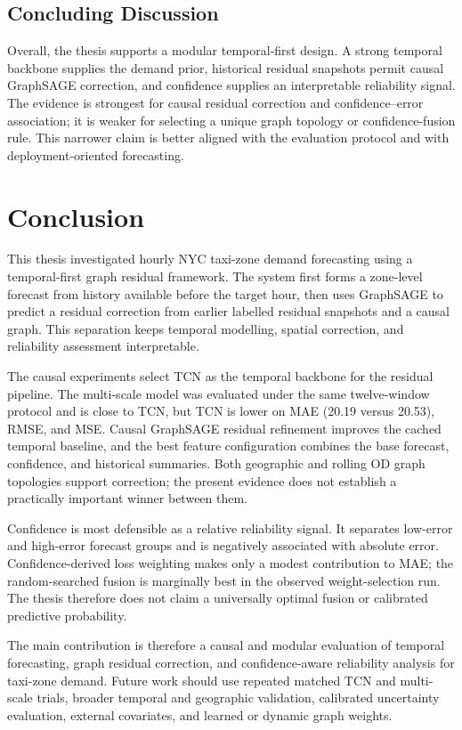\documentclass[12pt,a4paper]{report}
\begin{document}
	\section{Concluding Discussion}
	
Overall, the thesis supports a modular temporal-first design. A strong temporal backbone supplies the demand prior, historical residual snapshots permit causal GraphSAGE correction, and confidence supplies an interpretable reliability signal. The evidence is strongest for causal residual correction and confidence--error association; it is weaker for selecting a unique graph topology or confidence-fusion rule. This narrower claim is better aligned with the evaluation protocol and with deployment-oriented forecasting.
	
	\chapter{Conclusion}
	\label{sec:conclusion}
	
This thesis investigated hourly NYC taxi-zone demand forecasting using a temporal-first graph residual framework. The system first forms a zone-level forecast from history available before the target hour, then uses GraphSAGE to predict a residual correction from earlier labelled residual snapshots and a causal graph. This separation keeps temporal modelling, spatial correction, and reliability assessment interpretable.
	
The causal experiments select TCN as the temporal backbone for the residual pipeline. The multi-scale model was evaluated under the same twelve-window protocol and is close to TCN, but TCN is lower on MAE (20.19 versus 20.53), RMSE, and MSE. Causal GraphSAGE residual refinement improves the cached temporal baseline, and the best feature configuration combines the base forecast, confidence, and historical summaries. Both geographic and rolling OD graph topologies support correction; the present evidence does not establish a practically important winner between them.
	
Confidence is most defensible as a relative reliability signal. It separates low-error and high-error forecast groups and is negatively associated with absolute error. Confidence-derived loss weighting makes only a modest contribution to MAE; the random-searched fusion is marginally best in the observed weight-selection run. The thesis therefore does not claim a universally optimal fusion or calibrated predictive probability.
	
The main contribution is therefore a causal and modular evaluation of temporal forecasting, graph residual correction, and confidence-aware reliability analysis for taxi-zone demand. Future work should use repeated matched TCN and multi-scale trials, broader temporal and geographic validation, calibrated uncertainty evaluation, external covariates, and learned or dynamic graph weights.
	
	\printbibliography[heading=bibintoc,title={Bibliography}]
	
\end{document}
